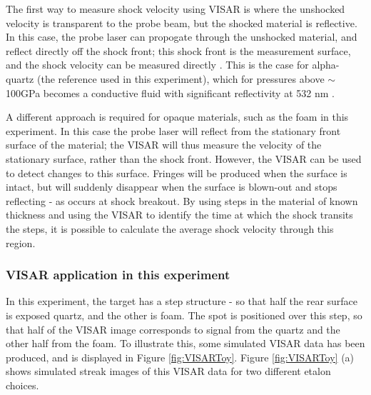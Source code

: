 The first way to measure shock velocity using VISAR is where the unshocked velocity is transparent to the probe beam, but the shocked material is reflective. In this case, the probe laser can propogate through the unshocked material, and reflect directly off the shock front; this shock front is the measurement surface, and the shock velocity can be measured directly \cite{Celliers2004}. This is the case for alpha-quartz (the reference used in this experiment), which for pressures above $\sim$ 100GPa becomes a conductive fluid with significant reflectivity at 532 \unit{\nano\meter} \cite{Hicks2006a}.

A different approach is required for opaque materials, such as the foam in this experiment. In this case the probe laser will reflect from the stationary front surface of the material; the VISAR will thus measure the velocity of the stationary surface, rather than the shock front. However, the VISAR can be used to detect changes to this surface. Fringes will be produced when the surface is intact, but will suddenly disappear when the surface is blown-out and stops reflecting - as occurs at shock breakout. By using steps in the material of known thickness and using the VISAR to identify the time at which the shock transits the steps, it is possible to calculate the average shock velocity through this region.

\subsubsection{VISAR application in this experiment}

In this experiment, the target has a step structure - so that half the rear surface is exposed quartz, and the other is foam. The spot is positioned over this step, so that half of the VISAR image corresponds to signal from the quartz and the other half from the foam. To illustrate this, some simulated VISAR data has been produced, and is displayed in Figure \ref{fig:VISARToy}. Figure \ref{fig:VISARToy} (a) shows simulated streak images of this VISAR data for two different etalon choices.

